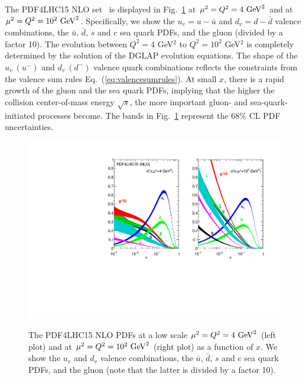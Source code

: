 The PDF4LHC15 NLO set~\cite{Butterworth:2015oua} is displayed in 
Fig.~\ref{fig:nnlopdfs} at $\mu^2=Q^2=4~{\rm GeV}^2$ and at
$\mu^2=Q^2=10^2~{\rm GeV}^2$.
%
Specifically, we show the $u_v=u-\bar{u}$ and $d_v=d-\bar{d}$ valence 
combinations, the $\bar{u}$, $\bar{d}$, $s$ and $c$ sea quark PDFs, 
and the gluon (divided by a factor 10).
%
The evolution between $Q^2=4$ GeV$^2$ to $Q^2=10^2$ GeV$^2$ is completely
determined by the solution of the DGLAP evolution equations.
%
The shape of the $u_v~(u^{-})$ and $d_v~(d^{-})$ valence quark combinations
reflects the constraints from the valence sum rules 
Eq.~(\ref{eq:valencesumrules}).
%
At small $x$, there is a rapid growth of the gluon and the sea quark PDFs, 
implying that the higher the collision center-of-mass energy $\sqrt{s}$, 
the more important gluon- and sea-quark-initiated processes become.
%
The bands in Fig.~\ref{fig:nnlopdfs} represent the 68\% CL PDF uncertainties.

\begin{figure}[!t]
\centering
  \includegraphics[scale=0.8]{plots/PDF4LHC15.pdf}\\
  \caption{\small The PDF4LHC15 NLO PDFs at a low scale
    $\mu^2=Q^2=4~{\rm GeV}^2$ (left plot) and at 
    $\mu^2=Q^2=10^2~{\rm GeV}^2$ (right plot) as a function of $x$.
    We show the $u_v$ and $d_v$ valence combinations, the $\bar{u}$,
    $\bar{d}$, $s$ and $c$ sea quark PDFs, and the gluon (note that
    the latter is divided by a factor 10).
    \label{fig:nnlopdfs}
  }
\end{figure}

